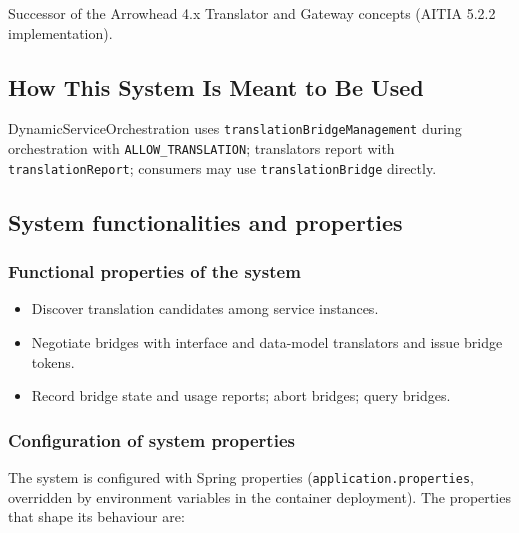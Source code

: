 \documentclass[a4paper]{arrowhead}
\begin{document}
Successor of the Arrowhead 4.x Translator and Gateway concepts (AITIA 5.2.2 implementation).

\subsection{How This System Is Meant to Be Used}
\label{sec:use}

Dynamic\allowbreak{}Service\allowbreak{}Orchestration uses \texttt{translation\allowbreak{}Bridge\allowbreak{}Management} during orchestration with \texttt{ALLOW\_\allowbreak{}TRANSLATION}; translators report with \texttt{translationReport}; consumers may use \texttt{translationBridge} directly.

\subsection{System functionalities and properties}
\label{sec:properties}

\subsubsection{Functional properties of the system}

\begin{itemize}
  \item Discover translation candidates among service instances.
  \item Negotiate bridges with interface and data-model translators and issue bridge tokens.
  \item Record bridge state and usage reports; abort bridges; query bridges.
\end{itemize}

\subsubsection{Configuration of system properties}

The system is configured with Spring properties (\texttt{application.properties}, overridden by environment variables in the container deployment). The properties that shape its behaviour are:
\end{document}
